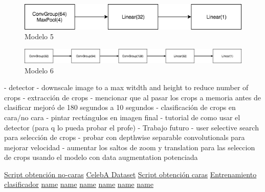 \documentclass[a4paper, 11pt]{article}
\begin{document}
		\begin{figure}[htb!]
	\begin{minipage}{1\textwidth}
		\centering
		\includegraphics[scale=.5]{pics/model5}
				\caption{Modelo 5}
	\end{minipage}\hfill
\end{figure}


\begin{figure}[htb!]
	\begin{minipage}{1\textwidth}
		\centering
		\includegraphics[scale=.5]{pics/model6}
				\caption{Modelo 6}
	\end{minipage}\hfill
\end{figure}	
			
- detector
	- downscale image to a max witdth and height to reduce number of crops
	- extracción de crops 
		- mencionar que al pasar los crops a memoria antes de clasificar mejoró de 180 segundos a 10 segundos
	- clasificación de crops en cara/no cara
	- pintar rectángulos en imagen final
	- tutorial de como usar el detector (para q lo pueda probar el profe)
- Trabajo futuro
	- user selective search para selección de crops
	- probar con depthwise separable convolutionals para mejorar velocidad
	- aumentar los saltos de zoom y translation para las seleccion de crops usando el modelo con data augmentation potenciada
	

\begin{thebibliography}{50}
	
	\href{https://github.com/pancho111203/pytorch-face-detection/blob/master/scripts/get_nofaces.py}{Script obtención no-caras}
	\href{http://mmlab.ie.cuhk.edu.hk/projects/CelebA.html}{CelebA Dataset}
	\href{https://github.com/pancho111203/pytorch-face-detection/blob/master/scripts/crop_faces.py}{Script obtención caras}
	\href{https://github.com/pancho111203/pytorch-face-detection/blob/master/face_classifier_training.py}{Entrenamiento clasificador}
	\href{url }{name}
	\href{url }{name}
	\href{url }{name}
	\href{url }{name}
	\href{url }{name}
	\href{url }{name}
\end{thebibliography}
\end{document}
